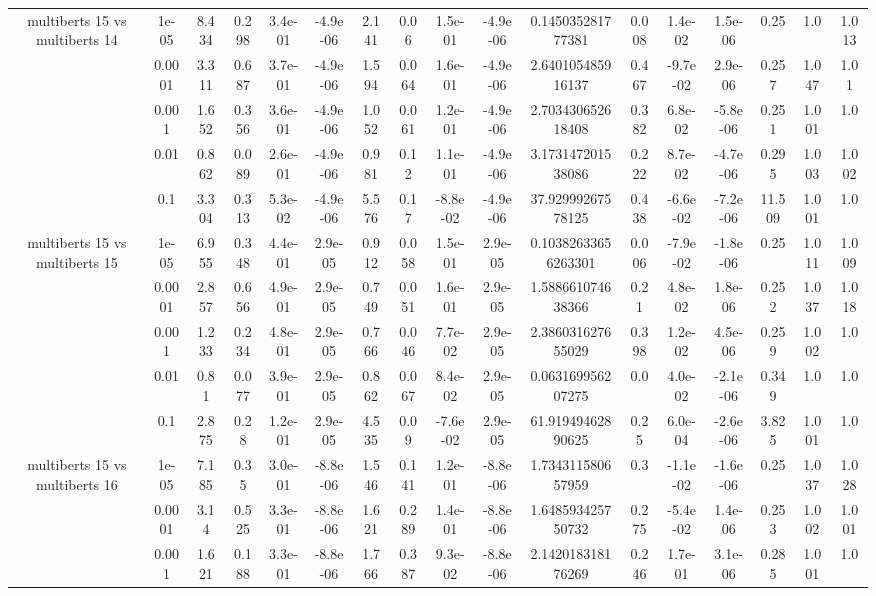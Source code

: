 \begin{tabular}{|c|c|c|c|c|c|c|c|c|c|c|c|c|c|c|c|c|}
\hline
\multirow{5}{*}{multiberts 15 vs multiberts 14} & 1e-05 & 8.434 & 0.298 & 3.4e-01 & -4.9e-06 & 2.141 & 0.06 & 1.5e-01 & -4.9e-06 & 0.145035281777381 & 0.008 & 1.4e-02 & 1.5e-06 & 0.25 & 1.0 & 1.013 \\
 & 0.0001 & 3.311 & 0.687 & 3.7e-01 & -4.9e-06 & 1.594 & 0.064 & 1.6e-01 & -4.9e-06 & 2.640105485916137 & 0.467 & -9.7e-02 & 2.9e-06 & 0.257 & 1.047 & 1.01 \\
 & 0.001 & 1.652 & 0.356 & 3.6e-01 & -4.9e-06 & 1.052 & 0.061 & 1.2e-01 & -4.9e-06 & 2.703430652618408 & 0.382 & 6.8e-02 & -5.8e-06 & 0.251 & 1.001 & 1.0 \\
 & 0.01 & 0.862 & 0.089 & 2.6e-01 & -4.9e-06 & 0.981 & 0.12 & 1.1e-01 & -4.9e-06 & 3.173147201538086 & 0.222 & 8.7e-02 & -4.7e-06 & 0.295 & 1.003 & 1.002 \\
 & 0.1 & 3.304 & 0.313 & 5.3e-02 & -4.9e-06 & 5.576 & 0.17 & -8.8e-02 & -4.9e-06 & 37.92999267578125 & 0.438 & -6.6e-02 & -7.2e-06 & 11.509 & 1.001 & 1.0 \\
\hline
\multirow{5}{*}{multiberts 15 vs multiberts 15} & 1e-05 & 6.955 & 0.348 & 4.4e-01 & 2.9e-05 & 0.912 & 0.058 & 1.5e-01 & 2.9e-05 & 0.10382633656263301 & 0.006 & -7.9e-02 & -1.8e-06 & 0.25 & 1.011 & 1.009 \\
 & 0.0001 & 2.857 & 0.656 & 4.9e-01 & 2.9e-05 & 0.749 & 0.051 & 1.6e-01 & 2.9e-05 & 1.588661074638366 & 0.21 & 4.8e-02 & 1.8e-06 & 0.252 & 1.037 & 1.018 \\
 & 0.001 & 1.233 & 0.234 & 4.8e-01 & 2.9e-05 & 0.766 & 0.046 & 7.7e-02 & 2.9e-05 & 2.386031627655029 & 0.398 & 1.2e-02 & 4.5e-06 & 0.259 & 1.002 & 1.0 \\
 & 0.01 & 0.81 & 0.077 & 3.9e-01 & 2.9e-05 & 0.862 & 0.067 & 8.4e-02 & 2.9e-05 & 0.063169956207275 & 0.0 & 4.0e-02 & -2.1e-06 & 0.349 & 1.0 & 1.0 \\
 & 0.1 & 2.875 & 0.28 & 1.2e-01 & 2.9e-05 & 4.535 & 0.09 & -7.6e-02 & 2.9e-05 & 61.91949462890625 & 0.25 & 6.0e-04 & -2.6e-06 & 3.825 & 1.001 & 1.0 \\
\hline
\multirow{5}{*}{multiberts 15 vs multiberts 16} & 1e-05 & 7.185 & 0.35 & 3.0e-01 & -8.8e-06 & 1.546 & 0.141 & 1.2e-01 & -8.8e-06 & 1.734311580657959 & 0.3 & -1.1e-02 & -1.6e-06 & 0.25 & 1.037 & 1.028 \\
 & 0.0001 & 3.14 & 0.525 & 3.3e-01 & -8.8e-06 & 1.621 & 0.289 & 1.4e-01 & -8.8e-06 & 1.648593425750732 & 0.275 & -5.4e-02 & 1.4e-06 & 0.253 & 1.002 & 1.001 \\
 & 0.001 & 1.621 & 0.188 & 3.3e-01 & -8.8e-06 & 1.766 & 0.387 & 9.3e-02 & -8.8e-06 & 2.142018318176269 & 0.246 & 1.7e-01 & 3.1e-06 & 0.285 & 1.001 & 1.0 \\

\end{tabular}
